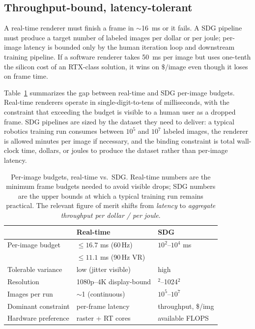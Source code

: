 \documentclass[10pt,journal,onecolumn]{IEEEtran}
\begin{document}
\subsection{Throughput-bound, latency-tolerant}

A real-time renderer must finish a frame in $\sim$16~ms or it fails.
A SDG pipeline must produce a target number of labeled images per dollar
or per joule; per-image latency is bounded only by the human iteration
loop and downstream training pipeline. If a software renderer takes
50~ms per image but uses one-tenth the silicon cost of an RTX-class
solution, it wins on $\$\slash\textrm{image}$ even though it loses on
frame time.

Table~\ref{tab:budgets} summarizes the gap between real-time and SDG
per-image budgets. Real-time renderers operate in single-digit-to-tens
of milliseconds, with the constraint that exceeding the budget is
visible to a human user as a dropped frame. SDG pipelines are sized by
the dataset they need to deliver: a typical robotics training run
consumes between $10^5$ and $10^7$ labeled images, the renderer is
allowed minutes per image if necessary, and the binding constraint is
total wall-clock time, dollars, or joules to produce the dataset
rather than per-image latency.

\begin{table}[t]
\centering
\caption{Per-image budgets, real-time vs.\ SDG. Real-time numbers are
the minimum frame budgets needed to avoid visible drops; SDG numbers
are the upper bounds at which a typical training run remains
practical. The relevant figure of merit shifts from \emph{latency} to
\emph{aggregate throughput per dollar / per joule}.}
\label{tab:budgets}
\footnotesize
\setlength{\tabcolsep}{2.5pt}
\renewcommand{\arraystretch}{1.12}
\begin{tabular}{@{}>{\raggedright\arraybackslash}p{}
                >{\raggedright\arraybackslash}p{}
                >{\raggedright\arraybackslash}p{}@{}}
\toprule
& \textbf{Real-time} & \textbf{SDG} \\
\midrule
Per-image budget         & $\leq 16.7$ ms (60\,Hz) & $10^2$--$10^4$ ms \\
                         & $\leq 11.1$ ms (90\,Hz VR)  & \\
Tolerable variance       & low (jitter visible)        & high \\
Resolution               & 1080p--4K display-bound     & 256$^2$--1024$^2$ \\
Images per run           & $\sim$1 (continuous)        & $10^5$--$10^7$ \\
Dominant constraint      & per-frame latency           & throughput, \$/img \\
Hardware preference      & raster + RT cores           & available FLOPS \\
\bottomrule
\end{tabular}
\end{table}
\end{document}
